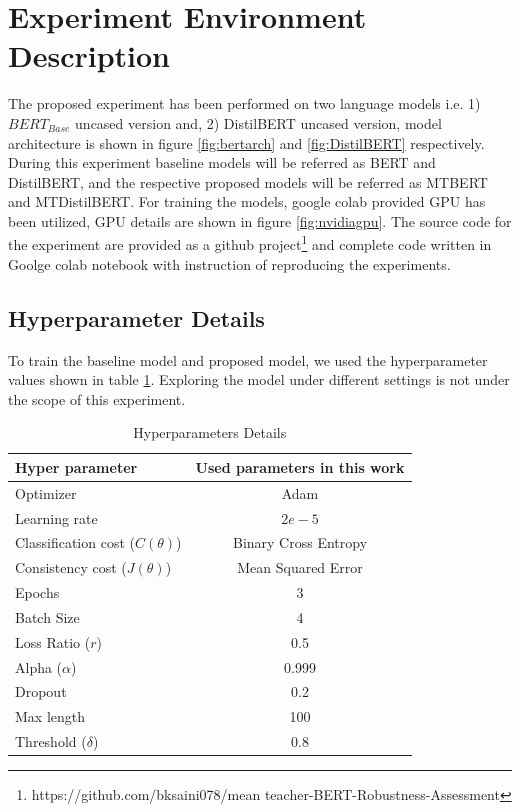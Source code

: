 \documentclass[%
	BCOR=8mm, %
	DIV=12,
	toc=bibliography, %
	toc=listof, %
	oneside, %
	egregdoesnotlikesansseriftitles, %
	]{scrbook}
\begin{document}
\section{Experiment Environment Description}
\label{section: experimentenv}
The proposed experiment has been performed on two language models i.e. 1) $BERT_{Base}$ uncased version  and, 2) DistilBERT uncased version, model architecture is shown in figure \ref{fig:bertarch} and \ref{fig:DistilBERT} respectively. During this experiment baseline models will be referred as BERT and DistilBERT, and the respective proposed models will be referred as MTBERT and MTDistilBERT. For training the models, google colab provided GPU has been utilized, GPU details are shown in figure \ref{fig:nvidiagpu}. The source code for the experiment are provided as a github project\footnote{https://github.com/bksaini078/mean teacher-BERT-Robustness-Assessment} and complete code written in Goolge colab notebook with instruction of reproducing the experiments.
\subsection{Hyperparameter Details}
\label{subsection:hyperparameter}
To train the baseline model and proposed model, we used the hyperparameter values shown in table \ref{table:HyperparameterTable}. Exploring the model under different settings is not under the scope of this experiment. 
\begin{table}[H]
\centering
\begin{tabular}{ l c | c | }
\hline
Hyper parameter 		& \multicolumn{2}{c}{Used parameters in this work}\\
\hline
Optimizer 				& \multicolumn{2}{c}{Adam} \\
Learning rate 			& \multicolumn{2}{c}{ $2e - 5$ } \\
Classification cost ($C(\theta)$) 		& \multicolumn{2}{c}{Binary Cross Entropy}  \\
Consistency cost ($J(\theta)$) 	& \multicolumn{2}{c}{Mean Squared Error}  \\
Epochs 				& \multicolumn{2}{c}{$3$} \\
Batch Size 			& \multicolumn{2}{c}{4 } \\
Loss Ratio ($r$)			&\multicolumn{2}{c}{0.5}\\
Alpha ($\alpha$)			&\multicolumn{2}{c}{0.999}\\
Dropout  			& \multicolumn{2}{c}{0.2}  \\
Max length 			 & \multicolumn{2}{c}{100}  \\
Threshold ($\delta$) & \multicolumn{2}{c}{ $0.8$ }\\
\hline
\end{tabular}
\caption[Details of hyperparameters details]{Hyperparameters Details}
\label{table:HyperparameterTable}
\end{table}
\end{document}
